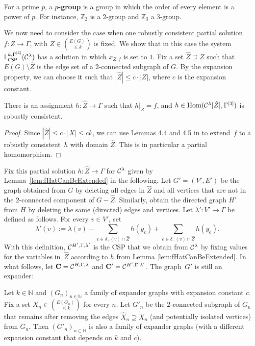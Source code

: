 \documentclass[a4paper,english, thm-restate]{lipics-v2021}
\newcommand{\defining}[1]{\textbf{#1}}
\newcommand{\StructC}{\mathbf{C}}
\newcommand{\Hom}[2]{\mathrm{Hom}(#1,#2)}
\newcommand{\leqs}{\mathsf{L}}
\newcommand{\cspiso}[3]{\leqs^{#1,#2}_{\mathsf{CSP}}(#3)}
\newcommand{\bbN}{\mathbb{N}}
\newcommand{\bbZ}{\mathbb{Z}}
\newcommand{\CosetGrpTmplt}[2]{#1^{[#2]}}
\begin{document}
	
	
	\noindent For a prime $p$, a \defining{$p$-group} is a group in which the order of every element is a power of $p$. For instance, $\bbZ_2$ is a $2$-group and $\bbZ_3$ a $3$-group.
	
	
	
	
	\noindent We now need to consider the case when one robustly consistent partial solution $f: Z \to \Gamma$, with $Z \in \binom{E(G)}{\leq k}$ is fixed.
	We show that in this case
	the system $\cspiso{k}{\CosetGrpTmplt{\Gamma}{3}}{\grpCSPf{H}{\Gamma}{\lambda}}$ has a solution in which $x_{Z,f}$ is set to $1$.
	Fix a set $\hat{Z} \supseteq Z$ such that $E(G) \setminus \hat{Z}$ is the edge set of a $2$-connected subgraph of $G$.
	By the expansion property, we can choose it such that $|\hat{Z}| \leq c \cdot |Z|$, where $c$ is the expansion constant. 
	\begin{lemma}
		\label{lem:fHatCanBeExtended}
		There is an assignment $h : \hat{Z} \to \Gamma$ such that $h|_{Z} = f$, and $h \in \Hom{\grpCSPf{H}{\Gamma}{\lambda}[\hat{Z}]}{\CosetGrpTmplt{\Gamma}{3}}$ is robustly consistent.
	\end{lemma}	
	\begin{proof}
		Since $|\hat{Z}| \leq c \cdot |X| \leq ck$, we can use Lemmas 4.4 and 4.5 in \cite{BerkholzGrohe2017} to extend~$f$ to a robustly consistent~$h$ with domain $\hat{Z}$. This is in particular a partial homomorphism.
	\end{proof}	
	\noindent Fix this partial solution $h \colon \hat{Z} \to \Gamma$ 
	for $\grpCSPf{H}{\Gamma}{\lambda}$ given by Lemma~\ref{lem:fHatCanBeExtended} in the following.
	Let $G'=(V',E')$ be the graph obtained from $G$ by deleting all edges in $\hat{Z}$
	and all vertices that are not in the $2$\nobreakdash-connected component of $G-\hat{Z}$.
	Similarly, obtain the directed graph $H'$ from $H$ by deleting the same (directed) edges and vertices.
	Let $\lambda' : V' \to \Gamma$ be defined as follows. For every $v \in V'$, set
	\[
	\lambda'(v) := \lambda(v) - \sum_{e \in \delta_+(v) \cap \hat{Z}} h(y_e) + \sum_{e \in \delta_-(v) \cap \hat{Z}} h(y_e) .
	\] 
	With this definition, $\grpCSP{H'}{\Gamma}{\lambda'}$ is the CSP that we obtain from $\grpCSPf{H}{\Gamma}{\lambda}$ by fixing values for the variables in~$\hat{Z}$ according to $h$ from Lemma \ref{lem:fHatCanBeExtended}. In what follows, let $\StructC = \grpCSP{H}{\Gamma}{\lambda}$
	and $\StructC' = \grpCSP{H'}{\Gamma}{\lambda'}$.
	The graph~$G'$ is still an expander:
	\begin{lemma}
		\label{lem:expandersRobust}
		Let $k \in \bbN$ and $(G_n)_{n \in \bbN}$ a family of expander graphs with expansion constant $c$. Fix a set $X_n \in \binom{E(G_n)}{\leq k}$ for every $n$.
		Let $G'_n$ be the $2$-connected subgraph of $G_n$ that remains after removing the edges $\hat{X}_n \supseteq X_n$ (and potentially isolated vertices) from $G_n$. Then $(G'_n)_{n \in \bbN}$ is also a family of expander graphs (with a different expansion constant that depends on $k$ and $c$).
	\end{lemma}	
\end{document}
